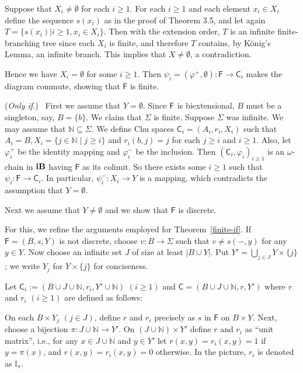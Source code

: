 \documentclass{LMCS}
\begin{document}
Suppose that $X_i \ne \emptyset$ for each $i \geq 1$.  For each $i
\geq 1$ and each element $x_i \in X_i$ define the sequence $s(x_i)$ as
in the proof of Theorem 3.5, and let again $T = \{s(x_i) | i \geq 1,
x_i \in X_i\}$. Then with the extension order, $T$ is an infinite
finite-branching tree since each $X_i$ is finite, and therefore $T$
contains, by K\"onig's Lemma, an infinite branch. This implies that $X
\ne \emptyset$, a contradiction.

Hence we have $X_i = \emptyset$ for some $i \geq 1$.  Then $\psi_i =
(\varphi^+,\emptyset): \mathsf{F} \to \mathsf{C}_i$ makes the diagram
commute, showing that $\mathsf{F}$ is finite.

(\emph{Only if.}) ~First we assume that $Y = \emptyset$.  Since ${\sf
F}$ is biextensional, $B$ must be a singleton, say, $B=\{b\}$. We
claim that $\Sigma$ is finite.  Suppose $\Sigma$ was infinite. We may
assume that $\mathbb{N} \subseteq \Sigma$.
We define Chu spaces  $\mathsf{C}_i = (A_i,r_i,X_i)$  such that
$A_i = B, X_i = \{j \in \mathbb{N}  \mid j \geq i\}$  and  $r_i(b,j) = 
j$  for each  $j \geq i$  and
$i \geq 1$. Also, let  $\varphi^+_i$  be the identity mapping and 
$\varphi^-_i$  be the inclusion.
Then  $(\mathsf{C}_i,\varphi_i)_{i \geq 1}$  is an $\omega$-chain in ${\bf 
iB}$  having  $\mathsf{F}$  as its
colimit. So there exists some  $i \geq 1$  such  that $\psi_i: \mathsf{F} 
\to \mathsf{C}_i$. In particular,
$\psi^-_i: X_i \to Y$  is a mapping, which contradicts the assumption 
that $Y = \emptyset$.

Next we assume that  $Y \ne \emptyset$  and we show that $\mathsf{F}$ is 
discrete.

 For this, we refine the arguments employed for
Theorem~\ref{finite-if}. If $\mathsf{F}=(B,s,Y)$ is not discrete,
choose $v: B \to \Sigma$ such that $v \ne s(-,y)$ for any $y \in Y$.
Now choose an infinite set $J$ of size at least $|B \cup Y|$.  Put $Y'
= \bigcup_{j \in J} Y \times \{j\}$; we write $Y_j$ for $Y \times
\{j\}$ for conciseness.

Let $\mathsf{C}_i := (B \cup J \cup \mathbb{N}, r_i, Y'
\cup\mathbb{N})$ $(i \geq 1)$ and $\mathsf{C}=(B \cup J \cup
\mathbb{N}, r, Y')$ where $r$ and $r_i$ $(i \geq 1)$ are defined as follows:


On each $B \times Y_j$ $(j \in J)$, define $r$ and $r_i$ precisely as
$s$ in $\mathsf{F}$ on $B \times Y$. Next, choose a bijection $\pi:J
\cup \mathbb{N} \to Y'$. On $(J \cup \mathbb{N}) \times Y'$ define $r$
and $r_i$ as ``unit matrix'', i.e.,  for any $x \in J \cup \mathbb{N}$
and $y \in Y'$ let $r(x,y) = r_i(x,y) = 1$ if $y = \pi(x)$, and
$r(x,y) = r_i(x,y)= 0$ otherwise. In the picture, $r_i$ is denoted as $\mathbb{I}_{\pi}$. 
\end{document}
